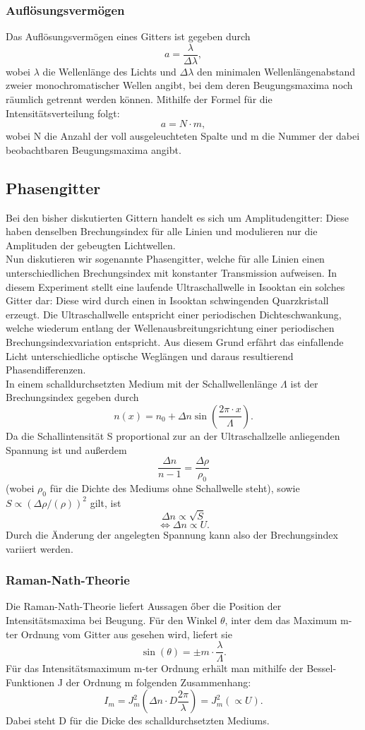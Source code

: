 \subsubsection{Auflösungsvermögen}
Das Auflösungsvermögen eines Gitters ist gegeben durch \[a=\frac{\lambda}{\Delta\lambda},\] wobei $\lambda$ die Wellenlänge des Lichts und $\Delta\lambda$ den minimalen Wellenlängenabstand zweier monochromatischer Wellen angibt, bei dem deren Beugungsmaxima noch räumlich getrennt werden können. Mithilfe der Formel für die Intensitätsverteilung folgt: \[a=N\cdot m,\] wobei N die Anzahl der voll ausgeleuchteten Spalte und m die Nummer der dabei beobachtbaren Beugungsmaxima angibt.
\subsection{Phasengitter}
Bei den bisher diskutierten Gittern handelt es sich um Amplitudengitter: Diese haben denselben Brechungsindex für alle Linien und modulieren nur die Amplituden der gebeugten Lichtwellen.\\
Nun diskutieren wir sogenannte Phasengitter, welche für alle Linien einen unterschiedlichen Brechungsindex mit konstanter Transmission aufweisen. In diesem Experiment stellt eine laufende Ultraschallwelle in Isooktan ein solches Gitter dar: Diese wird durch einen in Isooktan schwingenden Quarzkristall erzeugt. Die Ultraschallwelle entspricht einer periodischen Dichteschwankung, welche wiederum entlang der Wellenausbreitungsrichtung einer periodischen Brechungsindexvariation entspricht. Aus diesem Grund erfährt das einfallende Licht unterschiedliche optische Weglängen und daraus resultierend Phasendifferenzen.\\
In einem schalldurchsetzten Medium mit der Schallwellenlänge $\Lambda$ ist der Brechungsindex gegeben durch \[n(x)=n_{0}+\Delta n\sin\left(\frac{2\pi\cdot x}{\Lambda}\right).\] Da die Schallintensität S proportional zur an der Ultraschallzelle anliegenden Spannung ist und außerdem \[\frac{\Delta n}{n-1}=\frac{\Delta\rho}{\rho_{0}}\] (wobei $\rho_{0}$ für die Dichte des Mediums ohne Schallwelle steht), sowie $S\propto(\Delta\rho/(\rho))^{2}$ gilt, ist \[\Delta n\propto \sqrt{S}\]
\[\Leftrightarrow \Delta n \propto U.\]
Durch die Änderung der angelegten Spannung kann also der Brechungsindex variiert werden.\\
\subsubsection{Raman-Nath-Theorie}
Die Raman-Nath-Theorie liefert Aussagen őber die Position der Intensitätsmaxima bei Beugung. Für den Winkel $\theta$, inter dem das Maximum m-ter Ordnung vom Gitter aus gesehen wird, liefert sie \[\sin(\theta)=\pm m\cdot\frac{\lambda}{\Lambda}.\]
Für das Intensitätsmaximum m-ter Ordnung erhält man mithilfe der Bessel-Funktionen J der Ordnung m folgenden Zusammenhang: \[I_{m}=J_{m}^{2}\left(\Delta n\cdot D\frac{2\pi}{\lambda}\right)=J_{m}^{2}(\propto U).\] Dabei steht D für die Dicke des schalldurchsetzten Mediums.